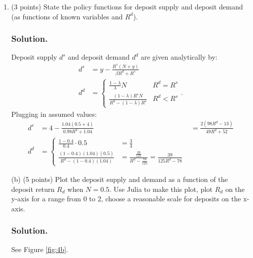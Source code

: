 \documentclass[12pt]{article}
\begin{document}
\begin{enumerate}
    \begin{enumerate}
        \item (3 points) State the policy functions for deposit supply and deposit demand (as functions of known variables and $R^d$).        
        \subsubsection*{Solution.}
        
        Deposit supply $d^s$ and deposit demand $d^d$ are given analytically by:
        \begin{align*}
            d^s &= y - \frac{R^s(N+y)}{\beta R^d + R^s}
            \\ d^d &= \begin{cases}
                \frac{1-\lambda}{\lambda}N &R^d = R^s
                \\ \frac{(1-\lambda)R^sN}{R^d - (1-\lambda)R^s} & R^d < R^s
            \end{cases}.
        \end{align*}
        Plugging in assumed values: 
        \begin{align*}
            d^s &= 4 - \frac{1.04(0.5+4)}{0.98 R^d + 1.04} &= \frac{2 (98 R^d - 13)}{49 R^d + 52}
            \\ d^d &= \begin{cases}
                \frac{1-0.4}{0.4}\cdot0.5 & =\frac{3 }{4}
                \\ \frac{(1-0.4)(1.04)(0.5)}{R^d - (1-0.4)(1.04)} & =\frac{\frac{39}{125}}{R^d - \frac{78}{125}} = \frac{39}{125R^{d}-78} %
            \end{cases}%
        \end{align*}
        
        \item[(b)] {(5 points)} Plot the deposit supply and demand as a function of the deposit return $R_d$ when $N = 0.5$. Use Julia to make this plot, plot $R_d$ on the y-axis for a range from 0 to 2, choose a reasonable scale for deposits on the x-axis.
        \subsubsection*{Solution.}

        See Figure \eqref{fig:4b}.


\end{enumerate}
\end{enumerate}
\end{document}
